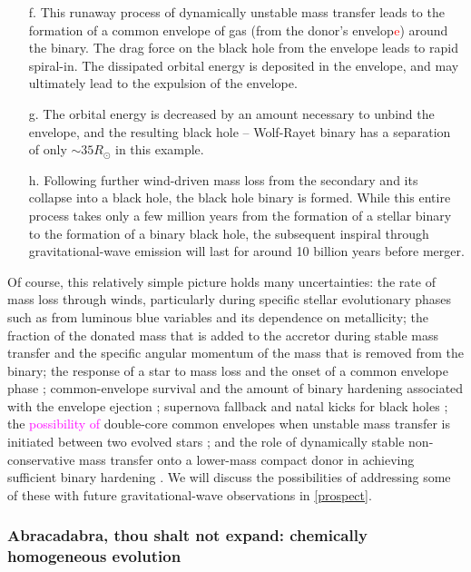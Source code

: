 \documentclass[iop,onecolumn]{revtex4}
\newcommand{\ajf}[1]{\textcolor{red}{#1}}
\newcommand{\ilya}[1]{\textcolor{magenta}{#1}}
\begin{document}
\begin{enumerate}
\item[f.] This runaway process of dynamically unstable mass transfer leads to the formation of a common envelope of gas (from the donor's envelop\ajf{e}) around the binary.  The drag force on the black hole from the envelope leads to rapid spiral-in.   The dissipated orbital energy is deposited in the envelope, and may ultimately lead to the expulsion of the envelope.  
\item[g.] The orbital energy is decreased by an amount necessary to unbind the envelope, and the resulting black hole -- Wolf-Rayet binary has a separation of only $\sim 35 R_\odot$ in this example.  
\item[h.] Following further wind-driven mass loss from the secondary and its collapse into a black hole, the black hole binary is formed.  While this entire process takes only a few million years from the formation of a stellar binary to the formation of a binary black hole, the subsequent inspiral through gravitational-wave emission will last for around 10 billion years before merger.
\end{enumerate}

Of course, this relatively simple picture holds many uncertainties: the rate of mass loss through winds, particularly during specific stellar evolutionary phases such as from luminous blue variables \citep[massive supergiant stars with significant outbursts and eruptions and associated rapid mass loss,][]{Mennekens:2014}  and its dependence on metallicity; the fraction of the donated mass that is added to the accretor during stable mass transfer and the specific angular momentum of the mass that is removed from the binary; the response of a star to mass loss and the onset of a common envelope phase \citep{Pavlovskii:2017}; common-envelope survival and the amount of binary hardening associated with the envelope ejection \ilya{\citep[e.g.,][]{Kruckow:2016}}; supernova fallback and natal kicks for black holes \citep[e.g.,][]{Repetto:2012,Mandel:2015kicks}; the \ilya{possibility of} double-core common envelopes when unstable mass transfer is initiated between two evolved stars \ilya{\citep{BetheBrown:1998,Dewi:2006}}; and the role of dynamically stable non-conservative mass transfer onto a lower-mass compact donor in achieving sufficient binary hardening  \citep{vandenHeuvel:2017,Neijssel:2018}.  We will discuss the possibilities of addressing some of these with future gravitational-wave observations in \autoref{prospect}.

\subsubsection{Abracadabra, thou shalt not expand: chemically homogeneous evolution}\label{sec:CHE}
\end{document}
